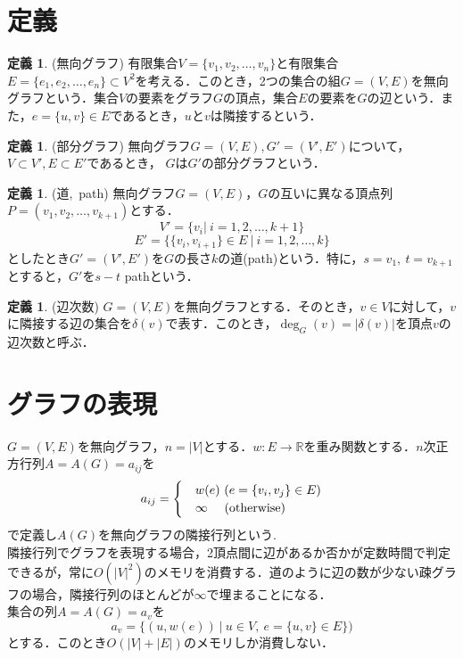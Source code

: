 \documentclass[a4paper,12pt]{jsreport}
\theoremstyle{definition}
\newtheorem{definition}[theorem]{定義}
\begin{document}
\section{定義}
\begin{definition}(無向グラフ)
    有限集合$V=\{v_1,v_2,\ldots,v_n\}$と有限集合$E=\{e_1,e_2,\ldots,e_n\}\subset V^2$を考える．このとき，2つの集合の組$G=(V,E)$を無向グラフという．集合$V$の要素をグラフ$G$の頂点，集合$E$の要素を$G$の辺という．また，$e=\{u,v\}\in E$であるとき，$u$と$v$は隣接するという．
\end{definition}
\begin{definition}(部分グラフ)
    無向グラフ$G=(V,E),G'=(V',E')$について，$V\subset V',E\subset E'$であるとき， $G$は$G'$の部分グラフという．
\end{definition}
\begin{definition}(道,\ path)
    無向グラフ$G=(V,E)$，$G$の互いに異なる頂点列$P=(v_1,v_2,\ldots, v_{k+1})$とする．
    \begin{equation}
        V'=\{v_i|\ i=1,2,\ldots,k+1\}
    \end{equation}
    \begin{equation}
        E'=\{\{v_i,v_{i+1}\}\in E\ |\ i=1,2,\ldots,k\}
    \end{equation}
    としたとき$G'=(V',E')$を$G$の長さ$k$の道(path)という．特に，$s=v_1,\ t=v_{k+1}$とすると，$G'$を$s-t$ pathという．
\end{definition}
\begin{definition}(辺次数)
    $G=(V,E)$を無向グラフとする．そのとき，$v\in V$に対して，$v$に隣接する辺の集合を$\delta(v)$で表す．このとき，$\deg_G(v)=|\delta(v)|$を頂点$ v$の辺次数と呼ぶ．
\end{definition}
\section{グラフの表現}
$G=(V,E)$を無向グラフ，$n=|V|$とする．$w:E\to \mathbb{R}$を重み関数とする．$n$次正方行列$A=A(G)=a_{ij}$を
\begin{eqnarray}
    a_{ij}=
    \begin{cases}
        & w(e)\ (e=\{v_i,v_j\}\in E)\\
        & \infty\ \ \ \ ({\rm otherwise})
    \end{cases}
\end{eqnarray}
で定義し$A(G)$を無向グラフの隣接行列という.\\
隣接行列でグラフを表現する場合，2頂点間に辺があるか否かが定数時間で判定できるが，常に$O(|V|^2)$のメモリを消費する．道のように辺の数が少ない疎グラフの場合，隣接行列のほとんどが$\infty$で埋まることになる．\\
集合の列$A=A(G)=a_v$を
\begin{equation}
    a_v=\{(u,w(e))\ |\ u\in V,\ e=\{u,v\}\in E \})
\end{equation}
とする．このとき$O(|V|+|E|)$のメモリしか消費しない．
\end{document}
